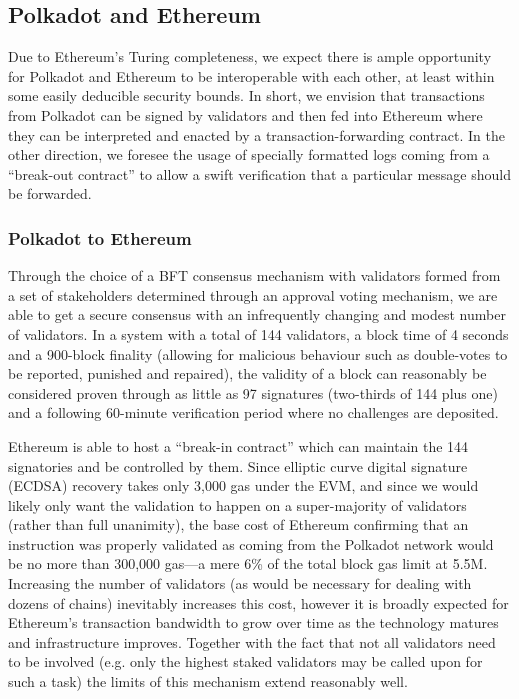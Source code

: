 \documentclass[9pt,oneside]{amsart}
\makeatletter
\newcommand*\eg{e.g.\@\xspace}
\makeatother
\begin{document}
\begin{multicols}{2}
\subsection{Polkadot and Ethereum}\label{disparity-and-ethereum}

 Due to Ethereum's Turing completeness, we expect there is ample opportunity for Polkadot and Ethereum to be interoperable with each other, at least within some easily deducible security bounds. In short, we envision that transactions from Polkadot can be signed by validators and then fed into Ethereum where they can be interpreted and enacted by a transaction-forwarding contract. In the other direction, we foresee the usage of specially formatted logs coming from a ``break-out contract'' to allow a swift verification that a particular message should be forwarded.

\subsubsection{Polkadot to Ethereum}\label{disparity-to-ethereum}

 Through the choice of a BFT consensus mechanism with validators formed from a set of stakeholders determined through an approval voting mechanism, we are able to get a secure consensus with an infrequently changing and modest number of validators. In a system with a total of 144 validators, a block time of 4 seconds and a 900-block finality (allowing for malicious behaviour such as double-votes to be reported, punished and repaired), the validity of a block can reasonably be considered proven through as little as 97 signatures (two-thirds of 144 plus one) and a following 60-minute verification period where no challenges are deposited.

 Ethereum is able to host a ``break-in contract'' which can maintain the 144 signatories and be controlled by them. Since elliptic curve digital signature (ECDSA) recovery takes only 3,000 gas under the EVM, and since we would likely only want the validation to happen on a super-majority of validators (rather than full unanimity), the base cost of Ethereum confirming that an instruction was properly validated as coming from the Polkadot network would be no more than 300,000 gas---a mere 6\% of the total block gas limit at 5.5M. Increasing the number of validators (as would be necessary for dealing with dozens of chains) inevitably increases this cost, however it is broadly expected for Ethereum's transaction bandwidth to grow over time as the technology matures and infrastructure improves. Together with the fact that not all validators need to be involved (\eg only the highest staked validators may be called upon for such a task) the limits of this mechanism extend reasonably well.


\end{multicols}
\end{document}
